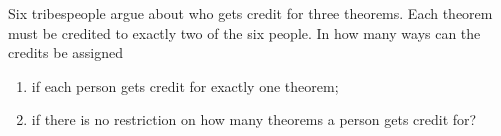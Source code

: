 Six tribespeople argue about who gets credit for three theorems. Each theorem must be credited to exactly two of the six people. In how many ways can the credits be assigned
\begin{enumerate}
\item[(a)] if each person gets credit for exactly one theorem;
\item[(b)] if there is no restriction on how many theorems a person gets credit for?
\end{enumerate}
